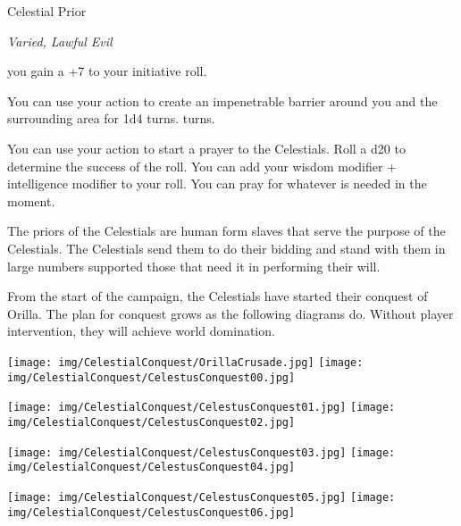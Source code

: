 \begin{monsterbox}{Celestial Prior}
	\begin{hangingpar}
		\textit{Varied, Lawful Evil}
	\end{hangingpar}
	\dndline%
	\basics[%
	armorclass = 24,
	hitpoints  = 220,
	speed      = 60 ft
	]
	\dndline%
	\stats[
	STR = \stat{8}, %
	DEX = \stat{16},
	CON = \stat{19},
	INT = \stat{16},
	WIS = \stat{30},
	CHA = \stat{28}
	]
	\dndline%
	\details[%
	languages = {Common, Elvish, Dwarvish, Gnomish, Halfling, Orc, Pandaren, Celestial, Draconic, Primordial},
	challenge = 18
	]
	\dndline%
	\begin{monsteraction}[Initiate]
		you gain a +7 to your initiative roll.
	\end{monsteraction}
	\begin{monsteraction}
		You can use your action to create an impenetrable barrier around you and the surrounding area for 1d4 turns. turns. 
	\end{monsteraction}
	\begin{monsteraction}
		You can use your action to start a prayer to the Celestials. Roll a d20 to determine the success of the roll. You can add your wisdom modifier + intelligence modifier to your roll. You can pray for whatever is needed in the moment.
	\end{monsteraction}	
	The priors of the Celestials are human form slaves that serve the purpose of the Celestials. The Celestials send them to do their bidding and stand with them in large numbers supported those that need it in performing their will.
\end{monsterbox}

From the start of the campaign, the Celestials have started their conquest of Orilla. The plan for conquest grows as the following diagrams do. Without player intervention, they will achieve world domination.

\begin{center}
	\texttt{[image: img/CelestialConquest/OrillaCrusade.jpg]} \texttt{[image: img/CelestialConquest/CelestusConquest00.jpg]}
		
	\texttt{[image: img/CelestialConquest/CelestusConquest01.jpg]} \texttt{[image: img/CelestialConquest/CelestusConquest02.jpg]}
	
	\texttt{[image: img/CelestialConquest/CelestusConquest03.jpg]} \texttt{[image: img/CelestialConquest/CelestusConquest04.jpg]}
	
	\texttt{[image: img/CelestialConquest/CelestusConquest05.jpg]} \texttt{[image: img/CelestialConquest/CelestusConquest06.jpg]}
\end{center}



